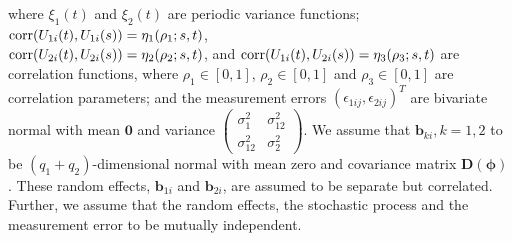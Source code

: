 \documentclass[12pt, notitlepage]{article}
\begin{document}
where 
$\xi_1(t)$ and $\xi_2(t)$ are periodic variance functions;  
${\rm corr} (U_{1i}(t), U_{1i}(s)) = \eta_1(\rho_1; s, t)$,  \\
${\rm corr} (U_{2i}(t), U_{2i}(s)) = \eta_2(\rho_2; s, t)$, 
and ${\rm corr} (U_{1i}(t), U_{2i}(s)) = \eta_3(\rho_3; s, t)$
 are correlation functions, where $\rho_1 \in [0, 1]$,  $\rho_2 \in [0, 1]$ and $\rho_3 \in [0, 1]$ are correlation parameters; 
and 
the measurement errors $(\epsilon_{1ij}, \epsilon_{2ij})^T$ are bivariate  normal with mean $\bm 0$ and variance $  \begin{pmatrix}
  \sigma_1^2 &  \sigma_{12}^2  \\
\sigma_{12}^2 &   \sigma_2^2 
 \end{pmatrix}$.
We assume that $\bm b_{ki}, k = 1, 2$ to be  $(q_1 + q_2)$-dimensional normal  with mean zero and covariance matrix $\boldsymbol D(\boldsymbol \phi)$.  
These random effects, $\bm b_{1i}$ and $\bm b_{2i}$, are assumed to be separate but correlated. 
Further, 
we assume that the random effects, the stochastic process and the measurement error to be mutually independent. 
\end{document}
